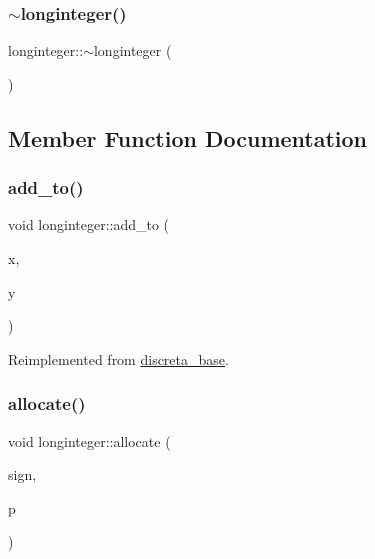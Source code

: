 \mbox{\label{classlonginteger_a6749d325fbff19a485dfa479f65afdb1}} 
\subsubsection{\texorpdfstring{$\sim$longinteger()}{~longinteger()}}
{\footnotesize\ttfamily longinteger\+::$\sim$longinteger (\begin{DoxyParamCaption}{ }\end{DoxyParamCaption})}



\subsection{Member Function Documentation}
\mbox{\label{classlonginteger_a457c74224b83d9fbfc904a391baab7ed}} 
\subsubsection{\texorpdfstring{add\+\_\+to()}{add\_to()}}
{\footnotesize\ttfamily void longinteger\+::add\+\_\+to (\begin{DoxyParamCaption}\item[{\mbox{\hyperlink{classdiscreta__base}{discreta\+\_\+base}} \&}]{x,  }\item[{\mbox{\hyperlink{classdiscreta__base}{discreta\+\_\+base}} \&}]{y }\end{DoxyParamCaption})\hspace{0.3cm}{\ttfamily [virtual]}}



Reimplemented from \mbox{\hyperlink{classdiscreta__base_a712a61311eb036d70a52871ed315f515}{discreta\+\_\+base}}.

\mbox{\label{classlonginteger_a6d5f2429a98a2fea96aa605d1a6b1e6e}} 
\subsubsection{\texorpdfstring{allocate()}{allocate()}}
{\footnotesize\ttfamily void longinteger\+::allocate (\begin{DoxyParamCaption}\item[{\mbox{\hyperlink{galois_8h_a09fddde158a3a20bd2dcadb609de11dc}{I\+NT}}}]{sign,  }\item[{const char $\ast$}]{p }\end{DoxyParamCaption})}

